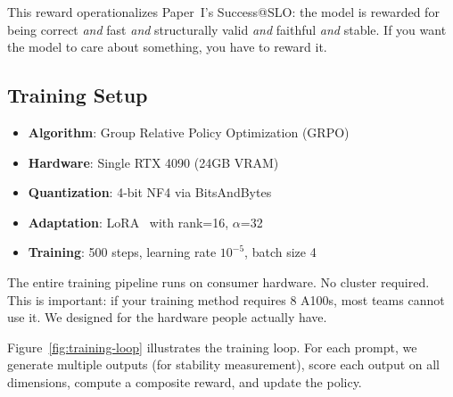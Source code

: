 \documentclass[11pt]{article}
\begin{document}
This reward operationalizes Paper~I's Success@SLO: the model is rewarded for being correct \emph{and} fast \emph{and} structurally valid \emph{and} faithful \emph{and} stable.
If you want the model to care about something, you have to reward it.

\subsection{Training Setup}

\begin{itemize}[leftmargin=12pt]
    \item \textbf{Algorithm}: Group Relative Policy Optimization (GRPO)~\citep{grpo}
    \item \textbf{Hardware}: Single RTX 4090 (24GB VRAM)
    \item \textbf{Quantization}: 4-bit NF4 via BitsAndBytes
    \item \textbf{Adaptation}: LoRA~\citep{hu2021lora} with rank=16, $\alpha$=32
    \item \textbf{Training}: 500 steps, learning rate $10^{-5}$, batch size 4
\end{itemize}

The entire training pipeline runs on consumer hardware.
No cluster required.
This is important: if your training method requires 8 A100s, most teams cannot use it.
We designed for the hardware people actually have.

Figure~\ref{fig:training-loop} illustrates the training loop.
For each prompt, we generate multiple outputs (for stability measurement), score each output on all dimensions, compute a composite reward, and update the policy.
\end{document}
